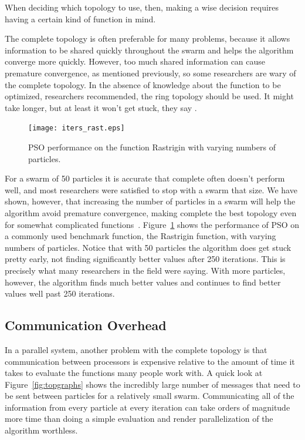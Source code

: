 \documentclass[onecolumn, 12pt]{article}
\begin{document}
When deciding which topology to use, then, making a wise decision requires
having a certain kind of function in mind.

The complete topology is often preferable for many problems, because it allows
information to be shared quickly throughout the swarm and helps the algorithm
converge more quickly.  However, too much shared information can cause
premature convergence, as mentioned previously, so some researchers are wary of
the complete topology.  In the absence of knowledge about the function to be
optimized, researchers recommended, the ring topology should be used.  It might
take longer, but at least it won't get stuck, they say \cite{bratton-sis07}.

\begin{figure}
  \centering
  \texttt{[image: iters\_rast.eps]}
  \caption{PSO performance on the function Rastrigin with varying numbers of
  particles.}
  \label{fig:rast}
\end{figure}

For a swarm of 50 particles it is accurate that complete often doesn't perform
well, and most researchers were satisfied to stop with a swarm that size.  We
have shown, however, that increasing the number of particles in a swarm will
help the algorithm avoid premature convergence, making complete the best
topology even for somewhat complicated functions~\cite{mcnabb-cec09}.
Figure~\ref{fig:rast} shows the performance of PSO on a commonly used benchmark
function, the Rastrigin function, with varying numbers of particles.  Notice
that with 50 particles the algorithm does get stuck pretty early, not finding
significantly better values after 250 iterations.  This is precisely what many
researchers in the field were saying.  With more particles, however, the
algorithm finds much better values and continues to find better values well
past 250 iterations.

\subsection{Communication Overhead}

In a parallel system, another problem with the complete topology is that
communication between processors is expensive relative to the amount of time it
takes to evaluate the functions many people work with.  A quick look at
Figure~\ref{fig:topgraphs} shows the incredibly large number of messages that
need to be sent between particles for a relatively small swarm.  Communicating
all of the information from every particle at every iteration can take orders
of magnitude more time than doing a simple evaluation and render
parallelization of the algorithm worthless.  
\end{document}
